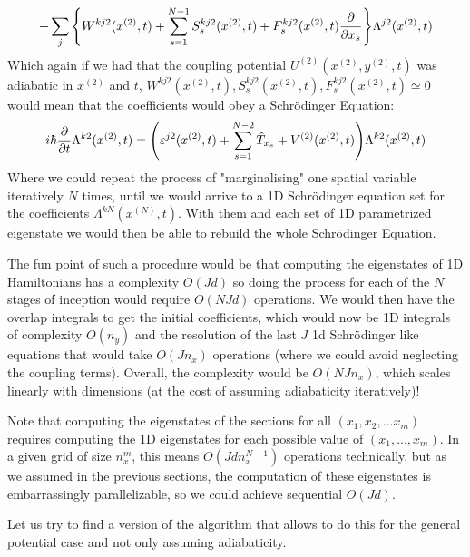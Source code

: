 \documentclass[11pt, a4paper]{article} %
\begin{document}
$$
+\sum_j \qty{ W^{kj2}(x^{(2)},t) + \sum_{s=1}^{N-1} S^{kj2}_s(x^{(2)},t)+F^{kj2}_s(x^{(2)},t)\pdv{}{x_s} } \Lambda^{j2}(x^{(2)},t) 
$$
Which again if we had that the coupling potential $U^{(2)}(x^{(2)}, y^{(2)},t)$ was adiabatic in $x^{(2)}$ and $t$, $W^{kj2}(x^{(2)},t),S^{kj2}_s(x^{(2)},t),F^{kj2}_s(x^{(2)},t)\simeq 0$ would mean that the coefficients would obey a Schrödinger Equation:
\begin{equation}\label{incept2}
i\hbar \pdv{}{t}\Lambda^{k2}(x^{(2)},t)  = \qty( \varepsilon^{j2}(x^{(2)},t) + \sum_{s=1}^{N-2}\hat{T}_{x_s} +V^{(2)}(x^{(2)},t))\Lambda^{k2}(x^{(2)},t)
\end{equation}
Where we could repeat the process of "marginalising" one spatial variable iteratively $N$ times, until we would arrive to a 1D Schrödinger equation set for the coefficients $\Lambda^{kN}(x^{(N)},t)$. With them and each set of 1D parametrized eigenstate we would then be able to rebuild the whole Schrödinger Equation.

The fun point of such a procedure would be that computing the eigenstates of 1D Hamiltonians has a complexity $O(Jd)$ so doing the process for each of the $N$ stages of inception would require $O(NJd)$ operations. We would then have the overlap integrals to get the initial coefficients, which would now be 1D integrals of complexity $O(n_y)$ and the resolution of the last $J$ 1d Schrödinger like equations that would take $O(Jn_x)$ operations (where we could avoid neglecting the coupling terms). Overall, the complexity would be $O(NJn_x)$, which scales linearly with dimensions (at the cost of assuming adiabaticity iteratively)!

Note that computing the eigenstates of the sections for all $(x_1,x_2,...x_m)$ requires computing the 1D eigenstates for each possible value of $(x_1,...,x_m)$. In a given grid of size $n_x^m$, this means $O(Jdn_x^{N-1})$ operations technically, but as we assumed in the previous sections, the computation of these eigenstates is embarrassingly parallelizable, so we could achieve sequential $O(Jd)$.

Let us try to find a version of the algorithm that allows to do this for the general potential case and not only assuming adiabaticity.
\newpage
\end{document}
